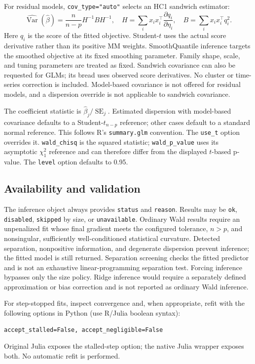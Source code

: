 \documentclass[11pt,a4paper]{article}
\newcommand{\code}[1]{\texttt{#1}}
\begin{document}
For residual models, \code{cov\_type="auto"} selects an HC1 sandwich estimator:
\[
 \widehat{\operatorname{Var}}(\widehat\beta)
 =\frac{n}{n-p}H^{-1}BH^{-1},\quad
 H=\sum_i x_i x_i^\top\frac{\partial q_i}{\partial\eta_i},\quad
 B=\sum_i x_i x_i^\top q_i^2.
\]
Here $q_i$ is the score of the fitted objective. Student-$t$ uses the actual score
derivative rather than its positive MM weights. SmoothQuantile inference targets
the smoothed objective at its fixed smoothing parameter. Family shape, scale, and
tuning parameters are treated as fixed. Sandwich covariance can also be requested
for GLMs; its bread uses observed score derivatives. No cluster or time-series
correction is included. Model-based covariance is not offered for residual models,
and a dispersion override is not applicable to sandwich covariance.

The coefficient statistic is $\widehat\beta_j/\operatorname{SE}_j$. Estimated
dispersion with model-based covariance defaults to a Student-$t_{n-p}$ reference;
other cases default to a standard normal reference. This follows R's
\code{summary.glm} convention. The \code{use\_t} option overrides it.
\code{wald\_chisq} is the squared statistic; \code{wald\_p\_value} uses its
asymptotic $\chi^2_1$ reference and can therefore differ from the displayed
$t$-based p-value. The \code{level} option defaults to 0.95.

\subsection{Availability and validation}
The inference object always provides \code{status} and \code{reason}.
Results may be \code{ok}, \code{disabled}, \code{skipped} by size, or
\code{unavailable}. Ordinary Wald results require an unpenalized fit whose final
gradient meets the configured tolerance, $n>p$, and nonsingular, sufficiently
well-conditioned statistical curvature. Detected separation, nonpositive
information, and degenerate dispersion prevent inference; the fitted model is
still returned. Separation screening checks the fitted predictor and is not an
exhaustive linear-programming separation test. Forcing inference bypasses only
the size policy. Ridge inference would require a separately defined approximation
or bias correction and is not reported as ordinary Wald inference.

For step-stopped fits, inspect convergence and, when appropriate, refit with
the following options in Python (use R/Julia boolean syntax):
\begin{lstlisting}
accept_stalled=False, accept_negligible=False
\end{lstlisting}
Original Julia exposes the stalled-step option;
the native Julia wrapper exposes both. No automatic refit is performed.
\end{document}
